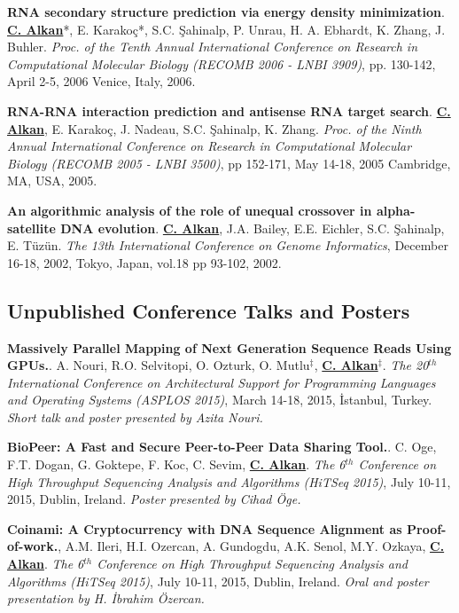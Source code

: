 \documentclass[margin,line]{res}
\begin{document}
\begin{resume}
\vspace{-.2cm}
{\bf RNA secondary structure prediction via energy density minimization}.
{\bf {\underline{C. Alkan}}}*, E. Karako\c{c}*, S.C. \c{S}ahinalp, P. Unrau,
H. A. Ebhardt, K. Zhang, J. Buhler.
{\em Proc. of the Tenth Annual International Conference on Research in Computational Molecular Biology
  (RECOMB 2006 - LNBI 3909)}, pp. 130-142,
  April 2-5, 2006 Venice, Italy, 2006.


\vspace{-.2cm}
 {\bf RNA-RNA interaction prediction and antisense RNA target search}.
  {\bf {\underline{C. Alkan}}}, E. Karako\c{c}, J. Nadeau, S.C. \c{S}ahinalp,
  K. Zhang.
  {\em Proc. of the Ninth Annual International Conference on Research in Computational Molecular Biology
    (RECOMB 2005 - LNBI 3500)}, pp 152-171, 
    May 14-18, 2005 Cambridge, MA, USA, 2005.

\vspace{-.2cm}
 {\bf An algorithmic analysis of the role of unequal crossover in
  alpha-satellite DNA evolution}.
  {\bf {\underline{C. Alkan}}}, J.A. Bailey, E.E. Eichler, S.C. \c{S}ahinalp, E. T\"{u}z\"{u}n.
{\em The 13th International Conference on Genome Informatics}, 
December 16-18, 2002, Tokyo, Japan, vol.18 pp 93-102, 2002.

\vspace{-.4cm}
\subsection{\small \sc  Unpublished Conference Talks and Posters}
\vspace{-.2cm}
 {\bf Massively Parallel Mapping of Next Generation Sequence Reads Using GPUs.}.
  A. Nouri, R.O. Selvitopi, O. Ozturk, O. Mutlu$^\ddag$, {\bf {\underline{C. Alkan}}}$^\ddag$.
{\em The 20$^{th}$ International Conference on Architectural Support for Programming Languages and Operating Systems (ASPLOS 2015)}, 
March 14-18, 2015, İstanbul, Turkey. {\it Short talk and poster presented by Azita Nouri.}

\vspace{-.2cm}
 {\bf BioPeer: A Fast and Secure Peer-to-Peer Data Sharing Tool.}.
  C. Oge, F.T. Dogan, G. Goktepe, F. Koc, C. Sevim, {\bf {\underline{C. Alkan}}}.
{\em The 6$^{th}$ Conference on High Throughput Sequencing Analysis and Algorithms (HiTSeq 2015)}, 
July 10-11, 2015, Dublin, Ireland. {\it Poster presented by Cihad Öge.}

\vspace{-.2cm}
 {\bf Coinami: A Cryptocurrency with DNA Sequence Alignment as Proof-of-work.},
  A.M. Ileri, H.I. Ozercan, A. Gundogdu, A.K. Senol, M.Y. Ozkaya, {\bf {\underline{C. Alkan}}}.
{\em The 6$^{th}$ Conference on High Throughput Sequencing Analysis and Algorithms (HiTSeq 2015)}, 
July 10-11, 2015, Dublin, Ireland. {\it Oral and poster presentation by H. İbrahim Özercan.}


\end{resume}
\end{document}
